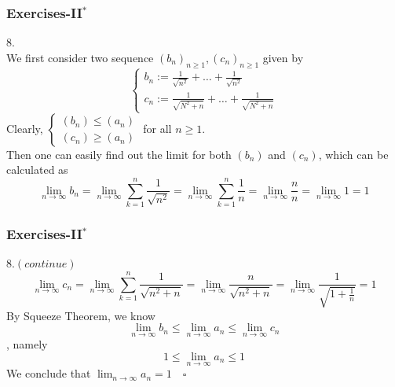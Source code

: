 \documentclass[12pt, t]{beamer}
\begin{document}
\begin{frame}
    \frametitle{Exercises-II$^*$}
8.\\
\hspace{1em} We first consider two sequence $(b_n)_{n\geq 1},(c_n)_{n\geq 1}$ given by 
\begin{equation*}
    \begin{cases}
        b_n:=\frac{1}{\sqrt{n^2}}+\dots+\frac{1}{\sqrt{n^2}}\\
        c_n:=\frac{1}{\sqrt{N^2+n}}+\dots+\frac{1}{\sqrt{N^2+n}}
    \end{cases}
\end{equation*}
\hspace{1em} Clearly, 
$\begin{cases}
    (b_n)\leq (a_n)\\
    (c_n)\geq (a_n)
\end{cases}$ 
for all $n\geq 1$. \\
\hspace{1em} Then one can easily find out the limit for both $(b_n)$ and $(c_n)$, which can be calculated as 
\begin{equation*}
    \lim_{n\rightarrow\infty}b_n=\lim_{n\rightarrow \infty}\sum^n_{k=1}\frac{1}{\sqrt{n^2}}=\lim_{n\rightarrow \infty}\sum^n_{k=1}\frac{1}{n}=\lim_{n\rightarrow\infty}\frac{n}{n}=\lim_{n\rightarrow\infty}1=1
\end{equation*}
\end{frame}

\begin{frame}
    \frametitle{Exercises-II$^*$}
8.$(continue)$\\
\begin{equation*}
    \lim_{n\rightarrow\infty}c_n=\lim_{n\rightarrow \infty}\sum^n_{k=1}\frac{1}{\sqrt{n^2+n}}=\lim_{n\rightarrow \infty}\frac{n}{\sqrt{n^2+n}}=\lim_{n\rightarrow\infty}\frac{1}{\sqrt{1+\frac{1}{n}}}=1
\end{equation*}
\hspace{1em} By Squeeze Theorem, we know 
\begin{equation*}
    \lim_{n\rightarrow\infty}b_n\leq \lim_{n\rightarrow\infty}a_n\leq \lim_{n\rightarrow\infty}c_n
\end{equation*}
, namely
\begin{equation*}
    1\leq \lim_{n\rightarrow\infty}a_n\leq1
\end{equation*}
We conclude that $ \lim_{n\rightarrow\infty}a_n=1\quad\square$
\end{frame}
\end{document}
